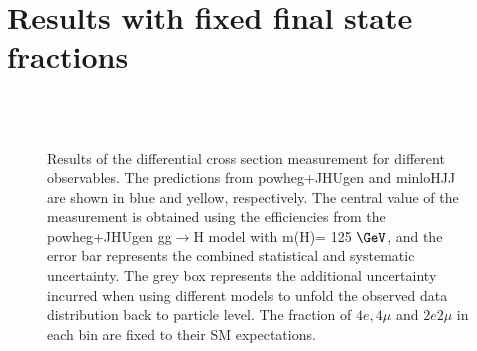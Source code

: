 \section{Results with fixed final state fractions}
\label{app:fixfrac}

\begin{figure}[!h!tb]
  \begin{center}

     \\
     \\
    \caption{Results of the differential cross section measurement for different observables. The predictions from {\sc powheg+JHUgen} and {\sc minloHJJ} are shown in blue and yellow, respectively. The central value of the measurement is obtained using the efficiencies from the {\sc powheg+JHUgen} gg$\rightarrow$H model with m(H)= 125 $\GeV$, and the error bar represents the combined statistical and systematic uncertainty. The grey box represents the additional uncertainty incurred when using different models to unfold the observed data distribution back to particle level. The fraction of $4e,4\mu$ and $2e2\mu$ in each bin are fixed to their SM expectations.
    }
  \label{fig:differential-results-fixfrac}
 \end{center}
\end{figure}

